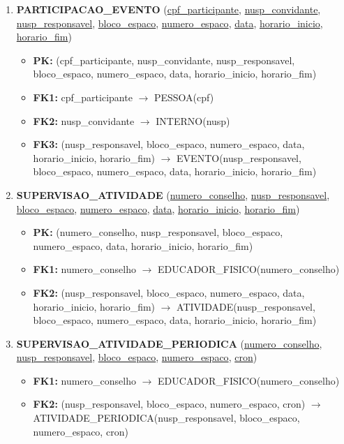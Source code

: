 \documentclass{article}
\begin{document}
\begin{enumerate}
    \item \textbf{PARTICIPACAO\_EVENTO} (\underline{cpf\_participante}, \underline{nusp\_convidante}, \underline{nusp\_responsavel}, \underline{bloco\_espaco}, \underline{numero\_espaco}, \underline{data}, \underline{horario\_inicio}, \underline{horario\_fim})
        \begin{itemize}
            \item \textbf{PK:} (cpf\_participante, nusp\_convidante, nusp\_responsavel, bloco\_espaco, numero\_espaco, data, horario\_inicio, horario\_fim)
            \item \textbf{FK1:} cpf\_participante $\rightarrow$ PESSOA(cpf)
            \item \textbf{FK2:} nusp\_convidante $\rightarrow$ INTERNO(nusp)
            \item \textbf{FK3:} (nusp\_responsavel, bloco\_espaco, numero\_espaco, data, horario\_inicio, horario\_fim) $\rightarrow$ EVENTO(nusp\_responsavel, bloco\_espaco, numero\_espaco, data, horario\_inicio, horario\_fim)
        \end{itemize}
        
    \item \textbf{SUPERVISAO\_ATIVIDADE} (\underline{numero\_conselho}, \underline{nusp\_responsavel}, \underline{bloco\_espaco}, \underline{numero\_espaco}, \underline{data}, \underline{horario\_inicio}, \underline{horario\_fim})
        \begin{itemize}
            \item \textbf{PK:} (numero\_conselho, nusp\_responsavel, bloco\_espaco, numero\_espaco, data, horario\_inicio, horario\_fim)
            \item \textbf{FK1:} numero\_conselho $\rightarrow$ EDUCADOR\_FISICO(numero\_conselho)
            \item \textbf{FK2:} (nusp\_responsavel, bloco\_espaco, numero\_espaco, data, horario\_inicio, horario\_fim) $\rightarrow$ ATIVIDADE(nusp\_responsavel, bloco\_espaco, numero\_espaco, data, horario\_inicio, horario\_fim)
        \end{itemize}

    \item \textbf{SUPERVISAO\_ATIVIDADE\_PERIODICA} (\underline{numero\_conselho}, \underline{nusp\_responsavel}, \underline{bloco\_espaco}, \underline{numero\_espaco}, \underline{cron})
        \begin{itemize}
            \item \textbf{FK1:} numero\_conselho $\rightarrow$ EDUCADOR\_FISICO(numero\_conselho)
            \item \textbf{FK2:} (nusp\_responsavel, bloco\_espaco, numero\_espaco, cron) $\rightarrow$ ATIVIDADE\_PERIODICA(nusp\_responsavel, bloco\_espaco, numero\_espaco, cron)
        \end{itemize}


\end{enumerate}
\end{document}
